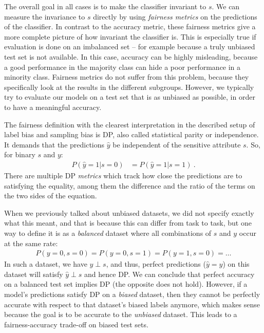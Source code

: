 The overall goal in all cases is to make the classifier invariant to $s$.
We can measure the invariance to $s$ directly by using \emph{fairness metrics}
on the predictions of the classifier.
In contrast to the accuracy metric,
these fairness metrics give a more complete picture of how invariant the classifier is.
This is especially true if evaluation is done on an imbalanced set
-- for example because a truly unbiased test set is not available.
In this case, accuracy can be highly misleading,
because a good performance in the majority class can hide a poor performance in a minority class.
Fairness metrics do not suffer from this problem,
because they specifically look at the results in the different subgroups.
However, we typically try to evaluate our models on a test set that is as unbiased as possible,
in order to have a meaningful accuracy.

The fairness definition with the clearest interpretation in the described setup of label bias and sampling bias is \acf{DP},
also called statistical parity or independence.
It demands that the predictions $\hat{y}$ be independent of the sensitive attribute \(s\).
So, for binary $s$ and $y$:
\begin{align}
  P(\hat{y}=1|s=0) &= P(\hat{y}=1|s=1)~.
  \label{eq:dp-def}
\end{align}
There are multiple \ac{DP} \emph{metrics} which track how close the predictions are to satisfying the equality,
among them the difference and the ratio of the terms on the two sides of the equation.

When we previously talked about unbiased datasets,
we did not specify exactly what this meant,
and that is because this can differ from task to task,
but one way to define it is as a \emph{balanced} dataset where all combinations of $s$ and $y$ occur at the same rate:
\begin{align}
  \label{eq:balanced-dataset}
  P(y=0,s=0)=P(y=0,s=1)=P(y=1,s=0)=\dots
\end{align}
In such a dataset, we have $y \perp s$, and thus,
perfect predictions ($\hat{y}=y$) on this dataset will satisfy $\hat{y} \perp s$ and hence \ac{DP}.
We can conclude that perfect accuracy on a balanced test set implies \acl{DP} (the opposite does not hold).
However, if a model's predictions satisfy \ac{DP} on a \emph{biased} dataset,
then they cannot be perfectly accurate with respect to that dataset's biased labels anymore,
which makes sense because the goal is to be accurate to the \emph{unbiased} dataset.
This leads to a fairness-accuracy trade-off on biased test sets.

